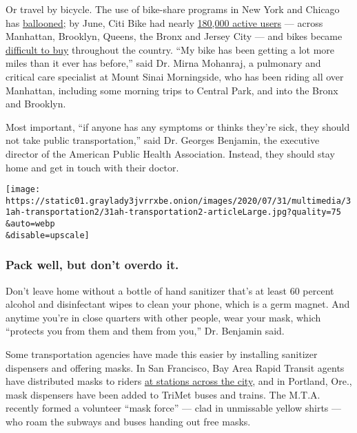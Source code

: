 Or travel by bicycle. The use of bike-share programs in New York and
Chicago has
\href{https://www.nytimes3xbfgragh.onion/2020/03/14/nyregion/coronavirus-nyc-bike-commute.html}{ballooned};
by June, Citi Bike had nearly
\href{https://d21xlh2maitm24.cloudfront.net/nyc/June-2020-Citi-Bike-Monthly-Report.pdf?mtime=20200722104600}{180,000
active users} --- across Manhattan, Brooklyn, Queens, the Bronx and
Jersey City --- and bikes became
\href{https://www.nytimes3xbfgragh.onion/2020/05/18/nyregion/bike-shortage-coronavirus.html}{difficult
to buy} throughout the country. ``My bike has been getting a lot more
miles than it ever has before,'' said Dr. Mirna Mohanraj, a pulmonary
and critical care specialist at Mount Sinai Morningside, who has been
riding all over Manhattan, including some morning trips to Central Park,
and into the Bronx and Brooklyn.

Most important, ``if anyone has any symptoms or thinks they're sick,
they should not take public transportation,'' said Dr. Georges Benjamin,
the executive director of the American Public Health Association.
Instead, they should stay home and get in touch with their doctor.

\texttt{[image: https://static01.graylady3jvrrxbe.onion/images/2020/07/31/multimedia/31ah-transportation2/31ah-transportation2-articleLarge.jpg?quality=75\\\&auto=webp\\\&disable=upscale]}

\hypertarget{pack-well-but-dont-overdo-it}{%
\subsubsection{Pack well, but don't overdo
it.}\label{pack-well-but-dont-overdo-it}}

Don't leave home without a bottle of hand sanitizer that's at least 60
percent alcohol and disinfectant wipes to clean your phone, which is a
germ magnet. And anytime you're in close quarters with other people,
wear your mask, which ``protects you from them and them from you,'' Dr.
Benjamin said.

Some transportation agencies have made this easier by installing
sanitizer dispensers and offering masks. In San Francisco, Bay Area
Rapid Transit agents have distributed masks to riders
\href{https://twitter.com/SFBART/status/1280632009560174592}{at stations
across the city}, and in Portland, Ore., mask dispensers have been added
to TriMet buses and trains. The M.T.A. recently formed a volunteer
``mask force'' --- clad in unmissable yellow shirts --- who roam the
subways and buses handing out free masks.

